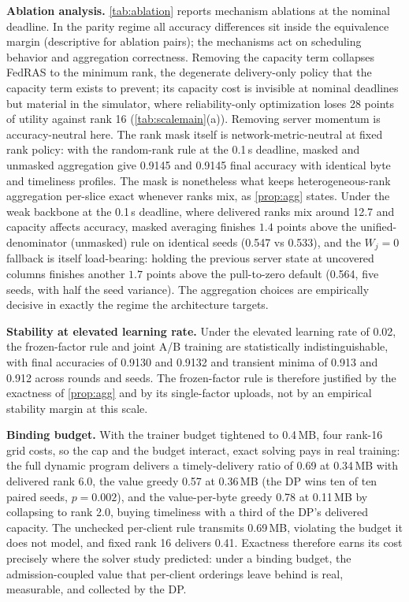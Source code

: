 \documentclass[a4paper,fleqn]{cas-dc}
\begin{document}
\textbf{Ablation analysis.} \cref{tab:ablation} reports mechanism ablations at the nominal deadline. In the parity regime all accuracy differences sit inside the equivalence margin (descriptive for ablation pairs); the mechanisms act on scheduling behavior and aggregation correctness. Removing the capacity term collapses FedRAS to the minimum rank, the degenerate delivery-only policy that the capacity term exists to prevent; its capacity cost is invisible at nominal deadlines but material in the simulator, where reliability-only optimization loses 28 points of utility against rank 16 (\cref{tab:scalemain}(a)). Removing server momentum is accuracy-neutral here. The rank mask itself is network-metric-neutral at fixed rank policy: with the random-rank rule at the 0.1\,s deadline, masked and unmasked aggregation give 0.9145 and 0.9145 final accuracy with identical byte and timeliness profiles. The mask is nonetheless what keeps heterogeneous-rank aggregation per-slice exact whenever ranks mix, as \cref{prop:agg} states. Under the weak backbone at the 0.1\,s deadline, where delivered ranks mix around 12.7 and capacity affects accuracy, masked averaging finishes $1.4$ points above the unified-denominator (unmasked) rule on identical seeds (0.547 vs 0.533), and the $W_j=0$ fallback is itself load-bearing: holding the previous server state at uncovered columns finishes another $1.7$ points above the pull-to-zero default (0.564, five seeds, with half the seed variance). The aggregation choices are empirically decisive in exactly the regime the architecture targets.
\par
\textbf{Stability at elevated learning rate.} Under the elevated learning rate of 0.02, the frozen-factor rule and joint A/B training are statistically indistinguishable, with final accuracies of 0.9130 and 0.9132 and transient minima of 0.913 and 0.912 across rounds and seeds. The frozen-factor rule is therefore justified by the exactness of \cref{prop:agg} and by its single-factor uploads, not by an empirical stability margin at this scale.
\par
\textbf{Binding budget.} With the trainer budget tightened to 0.4\,MB, four rank-16 grid costs, so the cap and the budget interact, exact solving pays in real training: the full dynamic program delivers a timely-delivery ratio of 0.69 at 0.34\,MB with delivered rank 6.0, the value greedy 0.57 at 0.36\,MB (the DP wins ten of ten paired seeds, $p=0.002$), and the value-per-byte greedy 0.78 at 0.11\,MB by collapsing to rank 2.0, buying timeliness with a third of the DP's delivered capacity. The unchecked per-client rule transmits 0.69\,MB, violating the budget it does not model, and fixed rank 16 delivers 0.41. Exactness therefore earns its cost precisely where the solver study predicted: under a binding budget, the admission-coupled value that per-client orderings leave behind is real, measurable, and collected by the DP.
\end{document}
